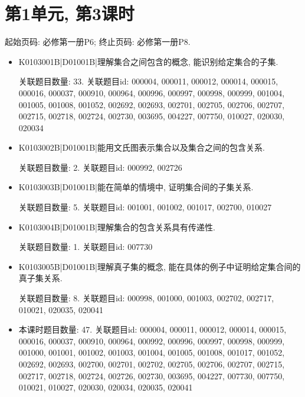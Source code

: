 \section*{第1单元, 第3课时}
起始页码: 必修第一册P6; 终止页码: 必修第一册P8.
\begin{itemize}
\item K0103001B|D01001B|理解集合之间包含的概念, 能识别给定集合的子集.

关联题目数量: 33. 关联题目id: 000004, 000011, 000012, 000014, 000015, 000016, 000037, 000910, 000964, 000996, 000997, 000998, 000999, 001004, 001005, 001008, 001052, 002692, 002693, 002701, 002705, 002706, 002707, 002715, 002718, 002724, 002730, 003695, 004227, 007750, 010027, 020030, 020034

\item K0103002B|D01001B|能用文氏图表示集合以及集合之间的包含关系.

关联题目数量: 2. 关联题目id: 000992, 002726

\item K0103003B|D01001B|能在简单的情境中, 证明集合间的子集关系.

关联题目数量: 5. 关联题目id: 001001, 001002, 001017, 002700, 010027

\item K0103004B|D01001B|理解集合的包含关系具有传递性.

关联题目数量: 1. 关联题目id: 007730

\item K0103005B|D01001B|理解真子集的概念, 能在具体的例子中证明给定集合间的真子集关系.

关联题目数量: 8. 关联题目id: 000998, 001000, 001003, 002702, 002717, 010021, 020035, 020041

\item 本课时题目数量: 47. 关联题目id: 000004, 000011, 000012, 000014, 000015, 000016, 000037, 000910, 000964, 000992, 000996, 000997, 000998, 000999, 001000, 001001, 001002, 001003, 001004, 001005, 001008, 001017, 001052, 002692, 002693, 002700, 002701, 002702, 002705, 002706, 002707, 002715, 002717, 002718, 002724, 002726, 002730, 003695, 004227, 007730, 007750, 010021, 010027, 020030, 020034, 020035, 020041

\end{itemize}

